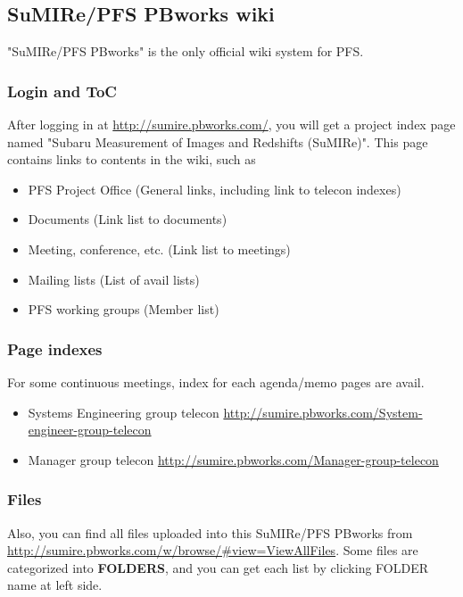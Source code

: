 \documentclass[a4paper,notitlepage]{article}
\begin{document}
\subsection{SuMIRe/PFS PBworks wiki}

"SuMIRe/PFS PBworks" is the only official wiki system for PFS. 

\subsubsection{Login and ToC}

After logging in at \url{http://sumire.pbworks.com/}, 
you will get a project index page named 
"Subaru Measurement of Images and Redshifts (SuMIRe)". 
This page contains links to contents in the wiki, such as 

\begin{itemize}
  \item PFS Project Office (General links, including link to telecon indexes)
  \item Documents (Link list to documents)
  \item Meeting, conference, etc.  (Link list to meetings)
  \item Mailing lists (List of avail lists)
  \item PFS working groups (Member list)
\end{itemize}

\subsubsection{Page indexes}

For some continuous meetings, index for each agenda/memo pages are avail.

\begin{itemize}
  \item Systems Engineering group telecon \url{http://sumire.pbworks.com/System-engineer-group-telecon}
  \item Manager group telecon \url{http://sumire.pbworks.com/Manager-group-telecon}
\end{itemize}


\subsubsection{Files}

Also, you can find all files uploaded into this SuMIRe/PFS PBworks from 
\url{http://sumire.pbworks.com/w/browse/#view=ViewAllFiles}.
Some files are categorized into {\bf FOLDERS}, and you can get each list by 
clicking FOLDER name at left side. 
\end{document}
